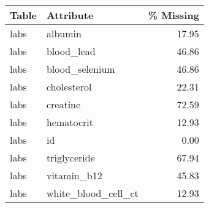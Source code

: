 \begin{tabular}{llr}
\toprule
 \textbf{Table} &                \textbf{Attribute} &  \textbf{\% Missing} \\
\midrule
  labs &                  albumin &      17.95 \\
  labs &               blood\_lead &      46.86 \\
  labs &           blood\_selenium &      46.86 \\
  labs &              cholesterol &      22.31 \\
  labs &                 creatine &      72.59 \\
  labs &               hematocrit &      12.93 \\
  labs &                       id &       0.00 \\
  labs &             triglyceride &      67.94 \\
  labs &              vitamin\_b12 &      45.83 \\
  labs &      white\_blood\_cell\_ct &      12.93 \\
\bottomrule
\end{tabular}
